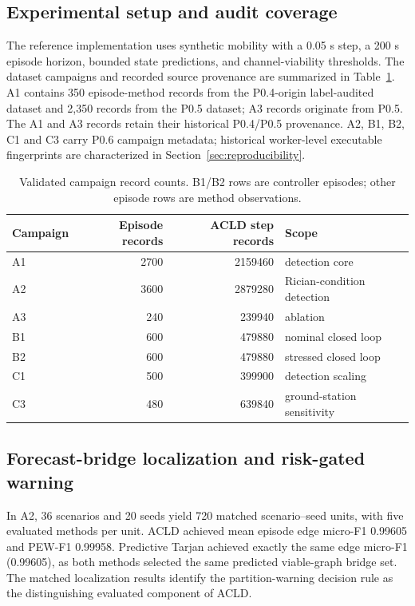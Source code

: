 \documentclass[preprint,12pt]{elsarticle}
\theoremstyle{definition}\newtheorem{definition}{Definition}
\theoremstyle{plain}\newtheorem{theorem}{Theorem}
\theoremstyle{plain}\newtheorem{lemma}{Lemma}
\theoremstyle{plain}\newtheorem{corollary}{Corollary}
\theoremstyle{plain}\newtheorem{assumption}{Assumption}
\theoremstyle{remark}\newtheorem{remark}[theorem]{Remark}
\begin{document}
\subsection{Experimental setup and audit coverage}
\label{subsec:sim_setup}
The reference implementation uses synthetic mobility with a 0.05 s step, a 200 s episode horizon, bounded state predictions, and channel-viability thresholds. The dataset campaigns and recorded source provenance are summarized in Table~\ref{tab:campaign_coverage}. A1 contains 350 episode-method records from the P0.4-origin label-audited dataset and 2,350 records from the P0.5 dataset; A3 records originate from P0.5. The A1 and A3 records retain their historical P0.4/P0.5 provenance. A2, B1, B2, C1 and C3 carry P0.6 campaign metadata; historical worker-level executable fingerprints are characterized in Section~\ref{sec:reproducibility}.

\begin{table}[htbp]
\centering\small
\caption{Validated campaign record counts. B1/B2 rows are controller episodes; other episode rows are method observations.}
\label{tab:campaign_coverage}
\begin{tabular}{lrrl}\toprule
Campaign & Episode records & ACLD step records & Scope\\\midrule
A1 & 2700 & 2159460 & detection core\\
A2 & 3600 & 2879280 & Rician-condition detection\\
A3 & 240 & 239940 & ablation\\
B1 & 600 & 479880 & nominal closed loop\\
B2 & 600 & 479880 & stressed closed loop\\
C1 & 500 & 399900 & detection scaling\\
C3 & 480 & 639840 & ground-station sensitivity\\\bottomrule
\end{tabular}
\end{table}

\subsection{Forecast-bridge localization and risk-gated warning}
\label{subsec:param_validation}
In A2, 36 scenarios and 20 seeds yield 720 matched scenario--seed units, with five evaluated methods per unit. ACLD achieved mean episode edge micro-F1 0.99605 and PEW-F1 0.99958. Predictive Tarjan achieved exactly the same edge micro-F1 (0.99605), as both methods selected the same predicted viable-graph bridge set. The matched localization results identify the partition-warning decision rule as the distinguishing evaluated component of ACLD.
\end{document}

